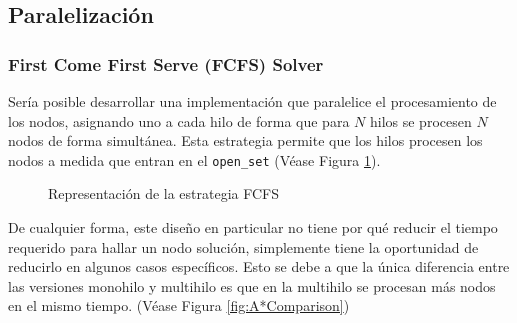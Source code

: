 \subsection{Paralelización}

\subsubsection{First Come First Serve (FCFS) Solver}

Sería posible desarrollar una implementación que paralelice el procesamiento de los nodos,
asignando uno a cada hilo de forma que para $N$ hilos se procesen $N$ nodos
de forma simultánea.
Esta estrategia permite que los hilos procesen los nodos a medida que entran en 
el \lstinline{open_set} (Véase Figura \ref{fig:RepresentacionFCFS}).

\begin{figure}
    \begin{center}
    \end{center}
    \caption{Representación de la estrategia FCFS}
    \label{fig:RepresentacionFCFS}
\end{figure}

De cualquier forma, este diseño en particular no tiene por qué reducir el tiempo
requerido para hallar un nodo solución, simplemente tiene la oportunidad de reducirlo
en algunos casos específicos.
Esto se debe a que la única diferencia entre las versiones monohilo y multihilo
es que en la multihilo se procesan más nodos en el mismo tiempo.
(Véase Figura \ref{fig:A*Comparison})

